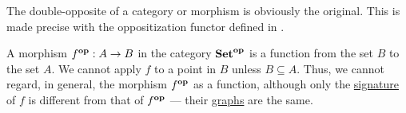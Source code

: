\begin{remark}\label{rem:double_opposite_category}
  The double-opposite of a category or morphism is obviously the original. This is made precise with the oppositization functor defined in .
\end{remark}

\begin{example}\label{ex:def:opposite_category}
  A morphism \( f^\oppos: A \to B \) in the category \( \cat{Set}^\oppos \) is a function from the set \( B \) to the set \( A \). We cannot apply \( f \) to a point in \( B \) unless \( B \subseteq A \). Thus, we cannot regard, in general, the morphism \( f^\oppos \) as a function, although only the \hyperref[def:function]{signature} of \( f \) is different from that of \( f^\oppos \) --- their \hyperref[def:set_valued_map/graph]{graphs} are the same.
\end{example}

